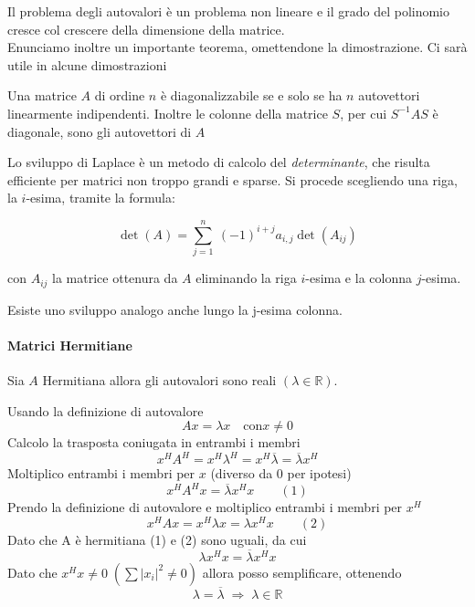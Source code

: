 Il problema degli autovalori \`e un problema non lineare e il grado del
polinomio cresce col crescere della dimensione della matrice.\\

Enunciamo inoltre un importante teorema, omettendone la dimostrazione.
Ci sar\`a utile in alcune dimostrazioni
\begin{theo}
  \label{eigenvalues:theo004}
  Una matrice $A$ di ordine $n$ \`e diagonalizzabile se e solo
  se ha $n$ autovettori linearmente indipendenti. Inoltre le colonne
  della matrice $S$, per cui $S^{-1}AS$ \`e diagonale, sono gli autovettori
  di $A$
\end{theo}

\begin{defn}
\label{sviluppo-laplace}
Lo sviluppo di Laplace \`e un metodo di calcolo del \emph{determinante}, che
risulta efficiente per matrici non troppo grandi e sparse. Si procede
scegliendo una riga, la $i$-esima, tramite la formula:

$$ \det(A) = \sum_{j=1}^n\ (-1)^{i + j} a_{i,j} \det(A_{ij}) $$

con $A_{ij}$ la matrice ottenura da $A$ eliminando la riga $i$-esima e la colonna
$j$-esima.

Esiste uno sviluppo analogo anche lungo la j-esima colonna.
\end{defn}


\paragraph{Matrici Hermitiane}
\begin{property}
Sia $A$ Hermitiana allora gli autovalori sono reali $(\lambda \in \mathbb{R})$. 
\end{property}

\begin{thproof}
Usando la definizione di autovalore 
$$ Ax = \lambda x \quad \text{con} x \neq 0 $$
Calcolo la trasposta coniugata in entrambi i membri 
$$ x^H A^H = x^H \lambda^H= x^H \overline{\lambda} = \overline{\lambda} x^{H} $$
Moltiplico entrambi i membri per $x$ (diverso da 0 per ipotesi)
$$ x^H A^H x = \overline{\lambda}  x^{H} x \qquad (1) $$
Prendo la definizione di autovalore e moltiplico entrambi i membri per $x^{H}$
$$x^{H} A x = x^{H} \lambda x = \lambda x^{H} x \qquad (2)$$
Dato che A \`e hermitiana (1) e (2) sono uguali, da cui
$$ \lambda x^{H} x = \overline{\lambda} x^{H} x$$
Dato che $x^{H} x \neq 0 \; (\sum |x_i|^{2} \neq 0) $ allora posso
 semplificare, ottenendo
$$ \lambda=\overline{\lambda} \; \Rightarrow \; \lambda \in \mathbb{R} $$
\end{thproof}



